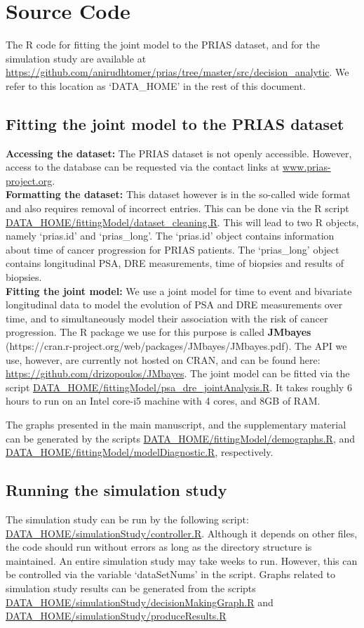 \section{Source Code}
The R code for fitting the joint model to the PRIAS dataset, and for the simulation study are available at \url{https://github.com/anirudhtomer/prias/tree/master/src/decision_analytic}. We refer to this location as `DATA\_HOME' in the rest of this document.

\subsection{Fitting the joint model to the PRIAS dataset}
\textbf{Accessing the dataset:}
The PRIAS dataset is not openly accessible. However, access to the database can be requested via the contact links at \url{www.prias-project.org}.\\

\textbf{Formatting the dataset:}
This dataset however is in the so-called wide format and also requires removal of incorrect entries. This can be done via the R script \url{DATA_HOME/fittingModel/dataset_cleaning.R}. This will lead to two R objects, namely `prias.id' and `prias\_long'. The `prias.id' object contains information about time of cancer progression for PRIAS patients. The `prias\_long' object contains longitudinal PSA, DRE measurements, time of biopsies and results of biopsies.\\

\textbf{Fitting the joint model:}
We use a joint model for time to event and bivariate longitudinal data to model the evolution of PSA and DRE measurements over time, and to simultaneously model their association with the risk of cancer progression. The R package we use for this purpose is called \textbf{JMbayes} (https://cran.r-project.org/web/packages/JMbayes/JMbayes.pdf). The API we use, however, are currently not hosted on CRAN, and can be found here:
\url{https://github.com/drizopoulos/JMbayes}. The joint model can be fitted via the script \url{DATA_HOME/fittingModel/psa_dre_jointAnalysis.R}. It takes roughly 6 hours to run on an Intel core-i5 machine with 4 cores, and 8GB of RAM. 

The graphs presented in the main manuscript, and the supplementary material can be generated by the scripts \url{DATA_HOME/fittingModel/demographs.R}, and \url{DATA_HOME/fittingModel/modelDiagnostic.R}, respectively.

\subsection{Running the simulation study}
The simulation study can be run by the following script: \url{DATA_HOME/simulationStudy/controller.R}. Although it depends on other files, the code should run without errors as long as the directory structure is maintained. An entire simulation study may take weeks to run. However, this can be controlled via the variable `dataSetNums' in the script. Graphs related to simulation study results can be generated from the scripts \url{DATA_HOME/simulationStudy/decisionMakingGraph.R} and \url{DATA_HOME/simulationStudy/produceResults.R} 